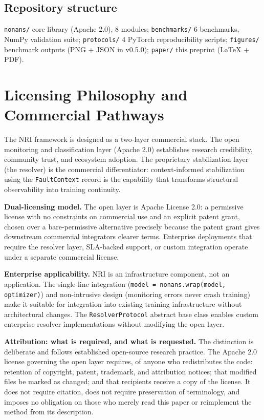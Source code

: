 \documentclass[11pt,a4paper]{article}
\theoremstyle{plain}
\begin{document}
\subsection{Repository structure}

\texttt{nonans/} core library (Apache 2.0), 8 modules;\quad
\texttt{benchmarks/} 6 benchmarks, NumPy validation suite;\quad
\texttt{protocols/} 4 PyTorch reproducibility scripts;\quad
\texttt{figures/} benchmark outputs (PNG + JSON in v0.5.0);\quad
\texttt{paper/} this preprint (LaTeX + PDF).


\section{Licensing Philosophy and Commercial Pathways}
\label{sec:commercial}

The NRI framework is designed as a two-layer commercial stack.
The open monitoring and classification layer (Apache 2.0) establishes
research credibility, community trust, and ecosystem adoption.
The proprietary stabilization layer (the resolver) is the commercial
differentiator: context-informed stabilization using the
\texttt{FaultContext} record is the capability that transforms
structural observability into training continuity.

\textbf{Dual-licensing model.}
The open layer is Apache License 2.0: a permissive license with no
constraints on commercial use and an explicit patent grant, chosen over
a bare-permissive alternative precisely because the patent grant gives
downstream commercial integrators clearer terms.
Enterprise deployments that require the resolver layer, SLA-backed
support, or custom integration operate under a separate commercial
license.

\textbf{Enterprise applicability.}
NRI is an infrastructure component, not an application.
The single-line integration (\texttt{model = nonans.wrap(model, optimizer)})
and non-intrusive design (monitoring errors never crash training) make
it suitable for integration into existing training infrastructure
without architectural changes.
The \texttt{ResolverProtocol} abstract base class enables custom
enterprise resolver implementations without modifying the open layer.

\textbf{Attribution: what is required, and what is requested.}
The distinction is deliberate and follows established open-source
research practice. The Apache 2.0 license governing the open layer
requires, of anyone who redistributes the code: retention of copyright,
patent, trademark, and attribution notices; that modified files be
marked as changed; and that recipients receive a copy of the license.
It does not require citation, does not require preservation of
terminology, and imposes no obligation on those who merely read this
paper or reimplement the method from its description.
\end{document}
